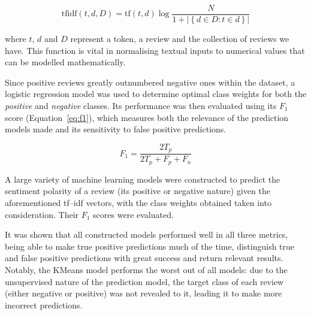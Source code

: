 \documentclass[11pt, a4paper]{pancake-article}
\begin{document}
\begin{equation}
	\text{tfidf}\left(t, d, D\right) = \text{tf}\left(t, d\right)\log\frac{N}{1 + \left|\left\{d \in D : t\in d\right\}\right|}
	\label{eq:tf-idf}
\end{equation}

where \(t\), \(d\) and \(D\) represent a token, a review and the collection of reviews we have. This function is vital
in normalising textual inputs to numerical values that can be modelled mathematically.

Since positive reviews greatly outnumbered negative ones within the dataset, a logistic regression model was used to
determine optimal class weights for both the \textit{positive} and \textit{negative} classes. Its performance was then evaluated using its $F_1$ score (Equation~\ref{eq:f1}), which measures both the relevance of the prediction models made and its sensitivity to false positive predictions.

\begin{equation}
	F_1 = \frac{2 T_p}{2 T_p + F_p + F_n}
	\label{eq:f1}
\end{equation}

A large variety of machine learning models were constructed
to predict the sentiment polarity of a review (its positive or negative nature) given the aforementioned tf--idf vectors, with
the class weights obtained taken into consideration. Their $F_1$ scores were evaluated.

It was shown that all constructed models performed well in all three metrics, being
able to make true positive predictions much of the time, distinguish true and false
positive predictions with great success and return relevant results. Notably, the KMeans
model performs the worst out of all models: due to the unsupervised nature of the prediction
model, the target class of each review (either negative or positive) was not revealed to it,
leading it to make more incorrect predictions.
\end{document}
